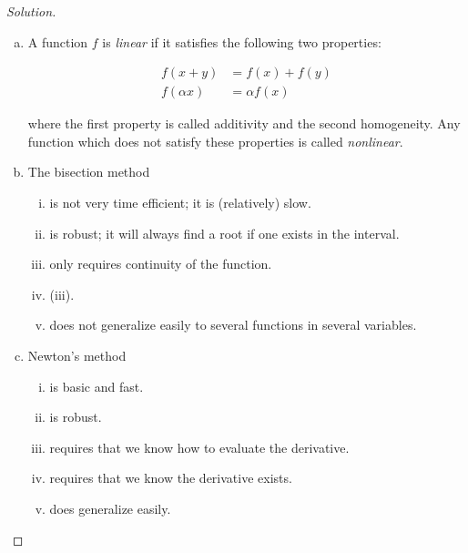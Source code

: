\documentclass[12pt,a4]{article}
\theoremstyle{definition}
\begin{document}
\begin{proof}[Solution]
	\begin{enumerate}[(a)]
		\item A function $f$ is \emph{linear} if it satisfies the following two properties: 
		
		\begin{align*}
		f(x + y) &= f(x) + f(y) \\
		f(\alpha x) &= \alpha f(x) 
		\end{align*}
		
		where the first property is called additivity and the second homogeneity. Any function which does not satisfy these properties is called \emph{nonlinear}. 
		
		\item The bisection method 
		\begin{enumerate}[(i)]
			\item is not very time efficient; it is (relatively) slow.
			
			\item is robust; it will always find a root if one exists in the interval.
			
			\item only requires continuity of the function.
			
			\item (iii).
			
			\item does not generalize easily to several functions in several variables.
		\end{enumerate}
		
		\item Newton's method 
		\begin{enumerate}[(i)]
			\item is basic and fast.
			
			\item is robust.
			
			\item requires that we know how to evaluate the derivative. 
			
			\item requires that we know the derivative exists.
			
			\item does generalize easily.
		\end{enumerate}
	

\end{enumerate}
\end{proof}
\end{document}
